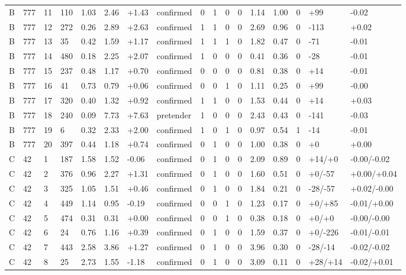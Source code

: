 \documentclass[11pt,a4paper]{article}
\begin{document}
{\begin{longtable}[]{@{}lllllllllllllllll@{}}
B & 777 & 11 & 110 & 1.03 & 2.46 & +1.43 & confirmed & 0 & 1 & 0 & 0 & 1.14 & 1.00 & 0 & +99 & -0.02 \\
B & 777 & 12 & 272 & 0.26 & 2.89 & +2.63 & confirmed & 1 & 1 & 0 & 0 & 2.69 & 0.96 & 0 & -113 & +0.02 \\
B & 777 & 13 & 35 & 0.42 & 1.59 & +1.17 & confirmed & 1 & 1 & 1 & 0 & 1.82 & 0.47 & 0 & -71 & -0.01 \\
B & 777 & 14 & 480 & 0.18 & 2.25 & +2.07 & confirmed & 1 & 0 & 0 & 0 & 0.41 & 0.36 & 0 & -28 & -0.01 \\
B & 777 & 15 & 237 & 0.48 & 1.17 & +0.70 & confirmed & 0 & 0 & 0 & 0 & 0.81 & 0.38 & 0 & +14 & -0.01 \\
B & 777 & 16 & 41 & 0.73 & 0.79 & +0.06 & confirmed & 0 & 0 & 1 & 0 & 1.11 & 0.25 & 0 & +99 & -0.00 \\
B & 777 & 17 & 320 & 0.40 & 1.32 & +0.92 & confirmed & 1 & 1 & 0 & 0 & 1.53 & 0.44 & 0 & +14 & +0.03 \\
B & 777 & 18 & 240 & 0.09 & 7.73 & +7.63 & pretender & 1 & 0 & 0 & 0 & 2.43 & 0.43 & 0 & -141 & -0.03 \\
B & 777 & 19 & 6 & 0.32 & 2.33 & +2.00 & confirmed & 1 & 0 & 1 & 0 & 0.97 & 0.54 & 1 & -14 & -0.01 \\
B & 777 & 20 & 397 & 0.44 & 1.18 & +0.74 & confirmed & 0 & 1 & 0 & 0 & 1.00 & 0.38 & 0 & +0 & +0.00 \\
C & 42 & 1 & 187 & 1.58 & 1.52 & -0.06 & confirmed & 0 & 1 & 0 & 0 & 2.09 & 0.89 & 0 & +14/+0 & -0.00/-0.02 \\
C & 42 & 2 & 376 & 0.96 & 2.27 & +1.31 & confirmed & 0 & 1 & 0 & 0 & 1.60 & 0.51 & 0 & +0/-57 & +0.00/+0.04 \\
C & 42 & 3 & 325 & 1.05 & 1.51 & +0.46 & confirmed & 0 & 1 & 0 & 0 & 1.84 & 0.21 & 0 & -28/-57 & +0.02/-0.00 \\
C & 42 & 4 & 449 & 1.14 & 0.95 & -0.19 & confirmed & 0 & 0 & 1 & 0 & 1.23 & 0.17 & 0 & +0/+85 & -0.01/+0.00 \\
C & 42 & 5 & 474 & 0.31 & 0.31 & +0.00 & confirmed & 0 & 0 & 1 & 0 & 0.38 & 0.18 & 0 & +0/+0 & -0.00/-0.00 \\
C & 42 & 6 & 24 & 0.76 & 1.16 & +0.39 & confirmed & 0 & 1 & 0 & 0 & 1.59 & 0.37 & 0 & +0/-226 & -0.01/-0.01 \\
C & 42 & 7 & 443 & 2.58 & 3.86 & +1.27 & confirmed & 0 & 1 & 0 & 0 & 3.96 & 0.30 & 0 & -28/-14 & -0.02/-0.02 \\
C & 42 & 8 & 25 & 2.73 & 1.55 & -1.18 & confirmed & 0 & 1 & 0 & 0 & 3.09 & 0.11 & 0 & +28/+14 & -0.02/+0.01 \\

\end{longtable}}
\end{document}
